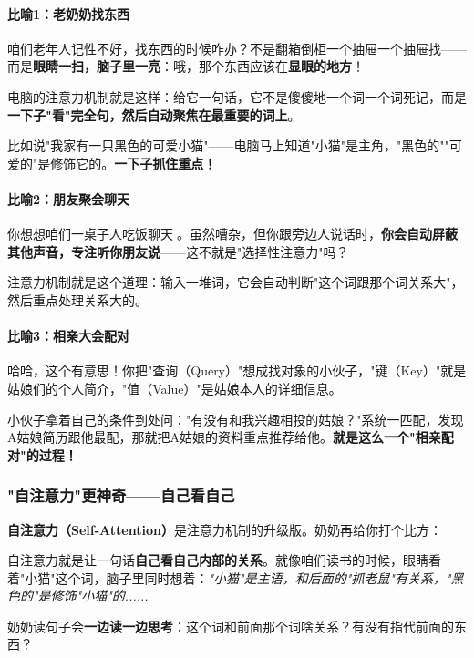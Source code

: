 \documentclass[11pt,a4paper]{article}
\begin{document}
\paragraph{比喻1：老奶奶找东西}

咱们老年人记性不好，找东西的时候咋办？不是翻箱倒柜一个抽屉一个抽屉找——而是\textbf{眼睛一扫，脑子里一亮}：哦，那个东西应该在\textbf{显眼的地方}！

电脑的注意力机制就是这样：给它一句话，它不是傻傻地一个词一个词死记，而是\textbf{一下子"看"完全句，然后自动聚焦在最重要的词上}。

比如说"我家有一只黑色的可爱小猫"——电脑马上知道"小猫"是主角，"黑色的""可爱的"是修饰它的。\textbf{一下子抓住重点！}

\paragraph{比喻2：朋友聚会聊天}

你想想咱们一桌子人吃饭聊天👏。虽然嘈杂，但你跟旁边人说话时，\textbf{你会自动屏蔽其他声音，专注听你朋友说}——这不就是"选择性注意力"吗？

注意力机制就是这个道理：输入一堆词，它会自动判断"这个词跟那个词关系大"，然后重点处理关系大的。

\paragraph{比喻3：相亲大会配对}

哈哈，这个有意思！你把"查询（Query）"想成找对象的小伙子，"键（Key）"就是姑娘们的个人简介，"值（Value）"是姑娘本人的详细信息。

小伙子拿着自己的条件到处问："有没有和我兴趣相投的姑娘？"系统一匹配，发现A姑娘简历跟他最配，那就把A姑娘的资料重点推荐给他。\textbf{就是这么一个"相亲配对"的过程！}

\subsubsection*{"自注意力"更神奇——自己看自己}

\textbf{自注意力（Self-Attention）}是注意力机制的升级版。奶奶再给你打个比方：

自注意力就是让一句话\textbf{自己看自己内部的关系}。就像咱们读书的时候，眼睛看着"小猫"这个词，脑子里同时想着：\textit{"小猫"是主语，和后面的"抓老鼠"有关系，"黑色的"是修饰"小猫"的......}

奶奶读句子会\textbf{一边读一边思考}：这个词和前面那个词啥关系？有没有指代前面的东西？
\end{document}
